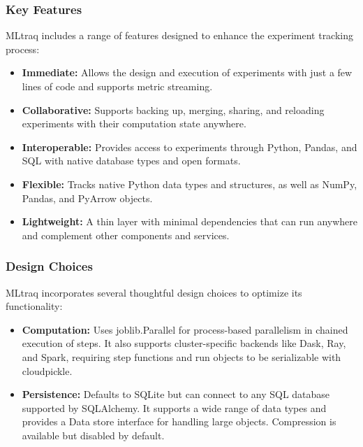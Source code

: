 \begin{itemize}
\subsubsection{Key Features}

MLtraq includes a range of features designed to enhance the experiment tracking process:

\begin{itemize}
    \item \textbf{Immediate:} Allows the design and execution of experiments with just a few lines of code and supports metric streaming.
    \item \textbf{Collaborative:} Supports backing up, merging, sharing, and reloading experiments with their computation state anywhere.
    \item \textbf{Interoperable:} Provides access to experiments through Python, Pandas, and SQL with native database types and open formats.
    \item \textbf{Flexible:} Tracks native Python data types and structures, as well as NumPy, Pandas, and PyArrow objects.
    \item \textbf{Lightweight:} A thin layer with minimal dependencies that can run anywhere and complement other components and services.
\end{itemize}

\subsubsection{Design Choices}

MLtraq incorporates several thoughtful design choices to optimize its functionality:

\begin{itemize}
    \item \textbf{Computation:} Uses joblib.Parallel for process-based parallelism in chained execution of steps. It also supports cluster-specific backends like Dask, Ray, and Spark, requiring step functions and run objects to be serializable with cloudpickle.
    \item \textbf{Persistence:} Defaults to SQLite but can connect to any SQL database supported by SQLAlchemy. It supports a wide range of data types and provides a Data store interface for handling large objects. Compression is available but disabled by default.
\end{itemize}


\end{itemize}
